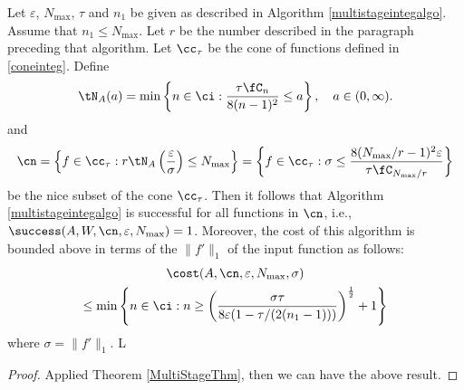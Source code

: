  \begin{theorem}

Let  $\varepsilon$, $N_{\max}$, $\tau$ and $n_1$ be given as described in Algorithm \ref{multistageintegalgo}.
Assume that $n_1 \le N_{\max}$. Let $r$ be the number described in the paragraph preceding that algorithm.
Let $\cc_\tau$ be the cone of functions defined in \eqref{coneinteg}.
Define
\[
\tN_A(a) = \min\left\{ n \in \ci : \frac{\tau \fC_n }{8(n-1)^2} \le a \right\}, \quad a \in (0,\infty).
\]
and
$$
\cn = \left \{ f \in \cc_\tau :r\tN_{A}\left(\frac{\varepsilon}{\sigma} \right) \le N_{\max} \right\}
= \left \{ f \in \cc_\tau : \sigma \le \frac{8(N_{\max}/r-1)^2 \varepsilon }{\tau \fC_{N_{\max}/r}  } \right\}
$$
be the nice subset of the cone $\cc_\tau$.  Then it follows that Algorithm \ref{multistageintegalgo} is successful for all functions in $\cn$,  i.e.,  $\success(A,W,\cn,\varepsilon,N_{\max}) = 1$.  Moreover, the cost of this algorithm is bounded above in terms of the $\|f'\|_{1}$ of the input function as follows:
\begin{multline}
\cost(A,\cn,\varepsilon,N_{\max},\sigma) \\
\le  \min\left\{ n \in \ci : n \ge \left(\frac{\sigma\tau}{8\varepsilon(1 - \tau/(2(n_{1}-1)))}\right)^{\frac{1}{2}} +1\right\}
\end{multline} where $\sigma=\|f'\|_{1}.$
   L%
 \end{theorem}

\begin{proof}
Applied Theorem \ref{MultiStageThm}, then we can have the above result.
\end{proof}

